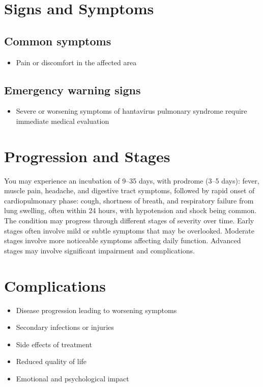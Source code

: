 \section{Signs and Symptoms}

\subsection{Common symptoms}
\begin{itemize}[noitemsep]
  \item Pain or discomfort in the affected area
  \end{itemize}

\subsection{Emergency warning signs}
\begin{itemize}[noitemsep]
  \item Severe or worsening symptoms of hantavirus pulmonary syndrome require immediate medical evaluation
\end{itemize}
\section{Progression and Stages}
You may experience an incubation of 9--35 days, with prodrome (3--5 days): fever, muscle pain, headache, and digestive tract symptoms, followed by rapid onset of cardiopulmonary phase: cough, shortness of breath, and respiratory failure from lung swelling, often within 24 hours, with hypotension and shock being common. The condition may progress through different stages of severity over time. Early stages often involve mild or subtle symptoms that may be overlooked. Moderate stages involve more noticeable symptoms affecting daily function. Advanced stages may involve significant impairment and complications.
\section{Complications}
\begin{itemize}[noitemsep]
  \item Disease progression leading to worsening symptoms
  \item Secondary infections or injuries
  \item Side effects of treatment
  \item Reduced quality of life
  \item Emotional and psychological impact
\end{itemize}
